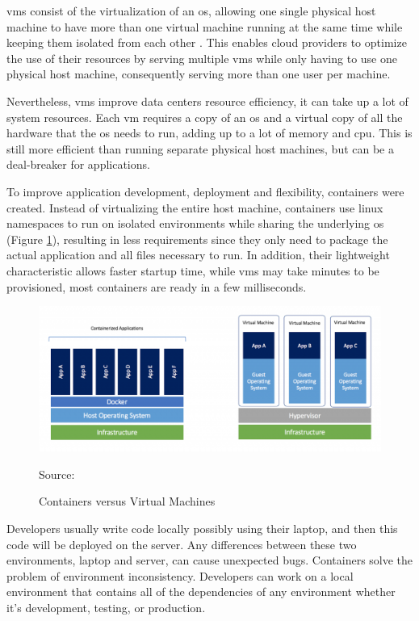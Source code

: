 \gls{vm}s consist of the virtualization of an \gls{os}, allowing one single physical host machine to have more than one virtual machine running at the same time while keeping them isolated from each other \cite{what_is_cloud}. This enables cloud providers to optimize the use of their resources by serving multiple \gls{vm}s while only having to use one physical host machine, consequently serving more than one user per machine.

Nevertheless, \gls{vm}s improve data centers resource efficiency, it can take up a lot of system resources. Each \gls{vm} requires a copy of an \gls{os} and a virtual copy of all the hardware that the \gls{os} needs to run, adding up to a lot of memory and \gls{cpu}. This is still more efficient than running separate physical host machines, but can be a deal-breaker for applications.

To improve application development, deployment and flexibility, containers were created. Instead of virtualizing the entire host machine, containers use linux namespaces to run on isolated environments while sharing the underlying \gls{os} (Figure \ref{figure:vm_vs_container}), resulting in less requirements since they only need to package the actual application and all files necessary to run. In addition, their lightweight characteristic allows faster startup time, while \gls{vm}s may take minutes to be provisioned, most containers are ready in a few milliseconds.

\begin{figure}[ht]
    \centering
    \includegraphics[width=\linewidth]{figures/Blog.-Are-containers-..VM-Image-1-1024x435.png}
    \caption{Containers versus Virtual Machines}
    {Source: \cite{are_containers_replacing_virtual_machines}}
    \label{figure:vm_vs_container}
\end{figure}

Developers usually write code locally possibly using their laptop, and then this code will be deployed on the server. Any differences between these two environments, laptop and server, can cause unexpected bugs. Containers solve the problem of environment inconsistency. Developers can work on a local environment that contains all of the dependencies of any environment whether it’s development, testing, or production.


